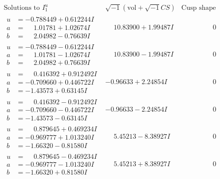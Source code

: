 \documentclass[1p]{elsarticle_modified}
\theoremstyle{definition}
\newcommand{\I}{\sqrt{-1}}
\begin{document}
$$\begin{array}{c|c|c}  
\text{Solutions to }I^u_{1}& \I (\text{vol} + \sqrt{-1}CS) & \text{Cusp shape}\\
 \hline 
\begin{aligned}
u &= -0.788449 + 0.612244 I \\
a &= \phantom{-}1.01781 + 1.02674 I \\
b &= \phantom{-}2.04982 - 0.76639 I\end{aligned}
 & \phantom{-}10.83900 + 1.99487 I & \phantom{-0.000000 } 0 \\ \hline\begin{aligned}
u &= -0.788449 - 0.612244 I \\
a &= \phantom{-}1.01781 - 1.02674 I \\
b &= \phantom{-}2.04982 + 0.76639 I\end{aligned}
 & \phantom{-}10.83900 - 1.99487 I & \phantom{-0.000000 } 0 \\ \hline\begin{aligned}
u &= \phantom{-}0.416392 + 0.912492 I \\
a &= -0.709660 + 0.446722 I \\
b &= -1.43573 + 0.63145 I\end{aligned}
 & -0.96633 + 2.24854 I & \phantom{-0.000000 } 0 \\ \hline\begin{aligned}
u &= \phantom{-}0.416392 - 0.912492 I \\
a &= -0.709660 - 0.446722 I \\
b &= -1.43573 - 0.63145 I\end{aligned}
 & -0.96633 - 2.24854 I & \phantom{-0.000000 } 0 \\ \hline\begin{aligned}
u &= \phantom{-}0.879645 + 0.469234 I \\
a &= -0.969777 + 1.013240 I \\
b &= -1.66320 - 0.81580 I\end{aligned}
 & \phantom{-}5.45213 - 8.38927 I & \phantom{-0.000000 } 0 \\ \hline\begin{aligned}
u &= \phantom{-}0.879645 - 0.469234 I \\
a &= -0.969777 - 1.013240 I \\
b &= -1.66320 + 0.81580 I\end{aligned}
 & \phantom{-}5.45213 + 8.38927 I & \phantom{-0.000000 } 0 \\ \hline\begin{aligned}

\end{aligned}
\end{array}$$
\end{document}
